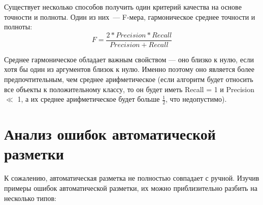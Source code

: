 \documentclass[14pt,russian]{extreport}
\begin{document}
Существует несколько способов получить один критерий качества на основе
точности и полноты. Один из них~— F-мера, гармоническое среднее точности и
полноты:
$$
F = \frac{2 * Precision * Recall}{Precision + Recall}
$$

Среднее гармоническое обладает важным свойством — оно близко к нулю, если хотя
бы один из аргументов близок к нулю. Именно поэтому оно является более
предпочтительным, чем среднее арифметическое (если алгоритм будет относить все
  объекты к положительному классу, то он будет иметь Recall = 1 и Precision
  $\ll$ 1, а их среднее арифметическое будет больше $\frac12$, что
недопустимо).

\section{Анализ ошибок автоматической разметки}

К сожалению, автоматическая разметка не полностью совпадает с ручной. Изучив
примеры ошибок автоматической разметки, их можно приблизительно разбить на
несколько типов:
\end{document}
